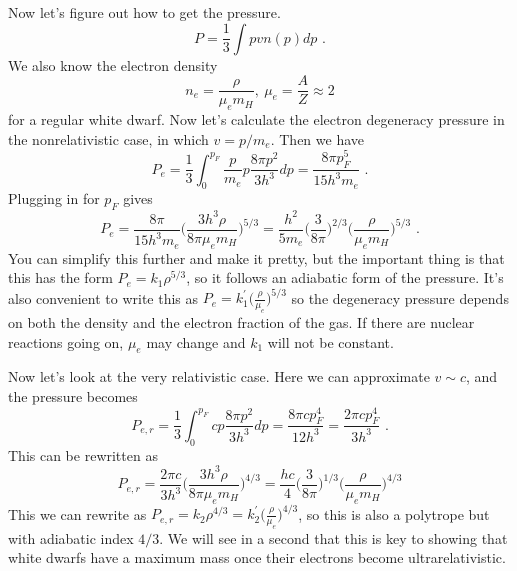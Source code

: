 \begin{enumerate}
      Now let's figure out how to get the pressure. %
      \begin{equation}
      P = \frac{1}{3} \int p v n(p) dp\,\,.
      \end{equation}
      We also know the electron density
      \begin{equation}
      n_e = \frac{\rho}{\mu_e m_H},~\mu_e = \frac{A}{Z} \approx 2
      \end{equation}
      for a regular white dwarf. Now let's calculate the electron degeneracy pressure in the nonrelativistic case, in which $v = p/m_e$. Then we have
      \begin{equation}
      P_e = \frac{1}{3} \int^{p_F}_0 \frac{p}{m_e} p \frac{8 \pi p^2}{3 h^3} dp = \frac{8 \pi p_F^5}{15 h^3 m_e}\,\,.
      \end{equation}
      Plugging in for $p_F$ gives
      \begin{equation}
      P_e = \frac{8\pi}{15 h^3 m_e} \biggl( \frac{3 h^3 \rho}{8 \pi\mu_e m_H}\biggr)^{5/3} = \frac{h^2}{5 m_e} \biggl( \frac{3}{8 \pi} \biggr)^{2/3}\biggl( \frac{\rho}{\mu_e m_H} \biggr)^{5/3}\,\,.
      \end{equation}
      You can simplify this further and make it pretty, but the important thing is that this has the form $P_e = k_1 \rho^{5/3}$, so it follows an adiabatic form of the pressure. It's also convenient to write this as $P_e = k_1^\prime \biggl( \frac{\rho}{\mu_e} \biggr)^{5/3}$ so the degeneracy pressure depends on both the density and the electron fraction of the gas. If there are nuclear reactions going on, $\mu_e$ may change and $k_1$ will not be constant.
      
      Now let's look at the very relativistic case. Here we can approximate $v \sim c$, and the pressure becomes
      \begin{equation}
      P_{e,r} = \frac{1}{3} \int^{p_F}_0 c p \frac{8 \pi p^2}{3 h^3} dp = \frac{8\pi c p_F^4}{12 h^3} = \frac{2\pi c p_F^4}{3 h^3}\,\,.
      \end{equation}
      This can be rewritten as
      \begin{equation}
      P_{e,r} = \frac{2\pi c}{3 h^3} \biggl( \frac{3 h^3 \rho}{8 \pi\mu_e m_H} \biggr)^{4/3} = \frac{h c}{4} \biggl(\frac{3}{8 \pi}\biggr)^{1/3} \biggl(\frac{\rho}{\mu_e m_H}\biggr)^{4/3}
      \end{equation}
      This we can rewrite as $P_{e,r} = k_2 \rho^{4/3} = k_2^\prime \biggl(\frac{\rho}{\mu_e}\biggr)^{4/3}$, so this is also a polytrope but with adiabatic index $4/3$. We will see in a second that this is key to showing that white dwarfs have a maximum mass once their electrons become ultrarelativistic.
      

\end{enumerate}
